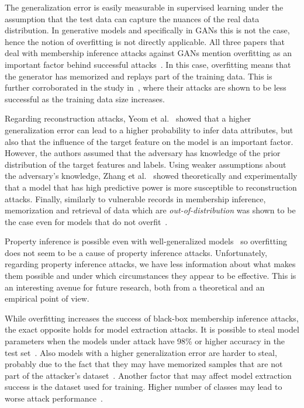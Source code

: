 The generalization error is easily measurable in supervised learning under the assumption that the test data can capture the nuances of the real data distribution. In generative models and specifically in GANs this is not the case, hence the notion of overfitting is not directly applicable. All three papers that deal with membership inference attacks against GANs mention overfitting as an important factor behind successful attacks~. In this case, overfitting means that the generator has memorized and replays part of the training data. This is further corroborated in the study in~, where their attacks are shown to be less successful as the training data size increases.

Regarding reconstruction attacks, Yeom et al.~ showed that a higher generalization error can lead to a higher probability to infer data attributes, but also that the influence of the target feature on the model is an important factor. However, the authors assumed that the adversary has knowledge of the prior distribution of the target features and labels. Using weaker assumptions about the adversary's knowledge, Zhang et al.~ showed theoretically and experimentally that a model that has high predictive power is more susceptible to reconstruction attacks. Finally, similarly to vulnerable records in membership inference, memorization and retrieval of data which are \textit{out-of-distribution} was shown to be the case even for models that do not overfit~.

Property inference is possible even with well-generalized models~ so overfitting does not seem to be a cause of property inference attacks. Unfortunately, regarding property inference attacks, we have less information about what makes them possible and under which circumstances they appear to be effective. This is an interesting avenue for future research, both from a theoretical and an empirical point of view.

While overfitting increases the success of black-box membership inference attacks, the exact opposite holds for model extraction attacks. It is possible to steal model parameters when the models under attack have 98\% or higher accuracy in the test set~. Also models with a higher generalization error are harder to steal, probably due to the fact that they may have memorized samples that are not part of the attacker's dataset~. Another factor that may affect model extraction success is the dataset used for training. Higher number of classes may lead to worse attack performance~.

